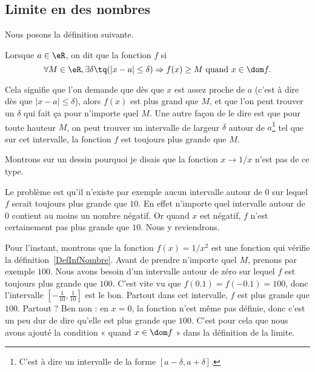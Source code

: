\subsection{Limite en des nombres}

Nous posons la définition suivante.
\begin{definition}      \label{DefInfNombre}
Lorsque $a\in\eR$, on dit que la fonction $f$  si
\[
  \forall M\in\eR,\exists \delta\tq (| x-a |\leq \delta )\Rightarrow f(x)\geq M\text{ quand }x\in\dom f.
\]
\end{definition}
Cela signifie que l'on demande que dès que $x$ est assez proche de $a$ (c'est à dire dès que $| x-a |\leq\delta$), alors $f(x)$ est plus grand que $M$, et que l'on peut trouver un $\delta$ qui fait ça pour n'importe quel $M$. Une autre façon de le dire est que pour toute hauteur $M$, on peut trouver un intervalle de largeur $\delta$ autour de $a$\footnote{C'est à dire un intervalle de la forme $[a-\delta,a+\delta]$.} tel que sur cet intervalle, la fonction $f$ est toujours plus grande que $M$.

Montrons sur un dessin pourquoi je disais que la fonction $x\to 1/x$ n'est pas de ce type.


Le problème est qu'il n'existe par exemple aucun intervalle autour de $0$ sur lequel $f$ serait toujours plus grande que $10$. En effet n'importe quel intervalle autour de $0$ contient au moins un nombre négatif. Or quand $x$ est négatif, $f$ n'est certainement pas plus grande que $10$. Nous y reviendrons.

Pour l'instant, montrons que la fonction $f(x)=1/x^2$ est une fonction qui vérifie la définition~\ref{DefInfNombre}.  Avant de prendre n'importe quel $M$, prenons par exemple $100$. Nous avons besoin d'un intervalle autour de zéro sur lequel $f$ est toujours plus grande que $100$. C'est vite vu que $f(0.1)=f(-0.1)=100$, donc l'intervalle $[-\frac{ 1 }{ 10 },\frac{1}{ 10 }]$ est le bon. Partout dans cet intervalle, $f$ est plus grande que $100$. Partout ? Ben non : en $x=0$, la fonction n'est même pas définie, donc c'est un peu dur de dire qu'elle est plus grande que $100$. C'est pour cela que nous avons ajouté la condition « quand $x\in\dom f$ » dans la définition de la limite.

